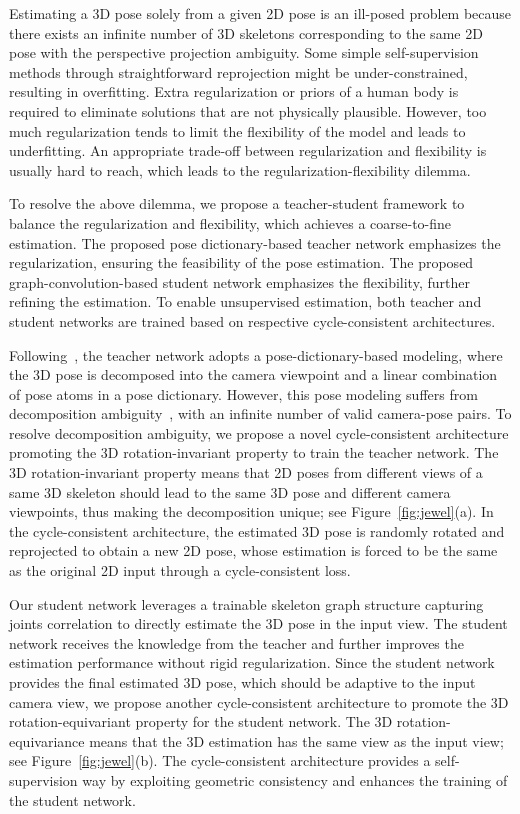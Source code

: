 \documentclass[letterpaper]{article} \usepackage{aaai21}  \usepackage{times}  \usepackage{helvet} \usepackage{courier}  \usepackage[hyphens]{url}  \usepackage{graphicx} \urlstyle{rm} \def\UrlFont{\rm}  \usepackage{natbib}  \usepackage{caption} \frenchspacing  \setlength{\pdfpagewidth}{8.5in}  \setlength{\pdfpageheight}{11in}
\begin{document}
Estimating a 3D pose solely from a given 2D pose is an ill-posed problem because there exists an infinite number of 3D skeletons corresponding to the same 2D pose with the perspective projection ambiguity. Some simple self-supervision methods through straightforward reprojection might be under-constrained, 
resulting in overfitting. Extra regularization or priors of a human body is required to eliminate solutions that are not physically plausible. However, too much regularization tends to limit the flexibility of the model and leads to underfitting. An appropriate trade-off between regularization and flexibility is usually hard to reach, which leads to the regularization-flexibility dilemma.

To resolve the above dilemma, we propose a teacher-student framework to balance the regularization and flexibility, which achieves a coarse-to-fine estimation. The proposed pose dictionary-based teacher network emphasizes the regularization, ensuring the feasibility of the pose estimation. The proposed graph-convolution-based student network emphasizes the flexibility, further refining the estimation. To enable unsupervised estimation, both teacher and student networks are trained based on respective cycle-consistent architectures.


Following~\cite{novotny2019c3dpo}, 
the teacher network adopts a pose-dictionary-based modeling, where the 3D pose is decomposed into the camera viewpoint and a linear combination of pose atoms in a pose dictionary.
However, this pose modeling suffers from decomposition ambiguity~\cite{dai2014simple}, with an infinite number of valid camera-pose pairs. 
To resolve decomposition ambiguity, we propose a novel cycle-consistent architecture promoting the 3D rotation-invariant property to train the teacher network. The 3D rotation-invariant property means that 2D poses from different views of a same 3D skeleton should lead to the same 3D pose and different camera viewpoints, thus making the decomposition unique; see Figure~\ref{fig:jewel}(a). In the cycle-consistent architecture, the estimated 3D pose is randomly rotated and reprojected to obtain a new 2D pose, whose estimation is forced to be the same as the original 2D input through a cycle-consistent loss.


Our student network leverages a trainable skeleton graph structure capturing joints correlation to directly estimate the 3D pose in the input view. The student network receives the knowledge from the teacher and further improves the estimation performance without rigid regularization. Since the student network provides the final estimated 3D pose, which should be adaptive to the input camera view, we propose another cycle-consistent architecture to promote the 3D rotation-equivariant property for the student network. The 3D rotation-equivariance means that the 3D estimation has the same view as the input view; see Figure~\ref{fig:jewel}(b). The cycle-consistent architecture provides a self-supervision way by exploiting geometric consistency and enhances the training of the student network.
\end{document}
